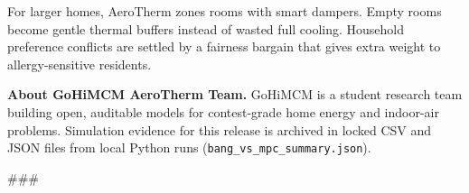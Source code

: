 \documentclass[11pt]{article}
\begin{document}
\medskip
\noindent
For larger homes, AeroTherm zones rooms with smart dampers.
Empty rooms become gentle thermal buffers instead of wasted full cooling.
Household preference conflicts are settled by a fairness bargain that
gives extra weight to allergy-sensitive residents.

\medskip
\noindent
{\small
\textbf{About GoHiMCM AeroTherm Team.}
GoHiMCM is a student research team building open, auditable models for
contest-grade home energy and indoor-air problems.
Simulation evidence for this release is archived in locked CSV and JSON
files from local Python runs (\texttt{bang\_vs\_mpc\_summary.json}).
}

\vspace{1.2em}
\begin{center}
\#\#\#
\end{center}
\end{document}
